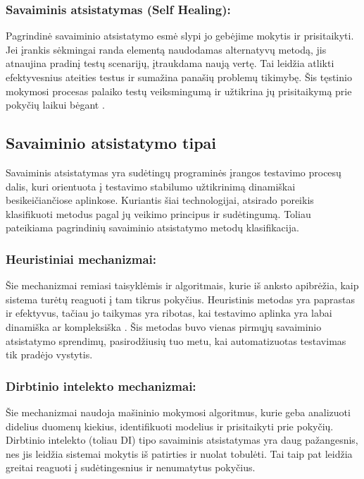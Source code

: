 \documentclass[
]{VUMIFPSkursinis}
\begin{document}
\subsubsection{Savaiminis atsistatymas (Self Healing):} Pagrindinė savaiminio atsistatymo esmė slypi jo gebėjime mokytis ir prisitaikyti. Jei įrankis sėkmingai randa elementą naudodamas alternatyvų metodą, jis atnaujina pradinį testų scenarijų, įtraukdama naują vertę. Tai leidžia atlikti efektyvesnius ateities testus ir sumažina panašių problemų tikimybę. Šis tęstinio mokymosi procesas palaiko testų veiksmingumą ir užtikrina jų prisitaikymą prie pokyčių laikui bėgant \cite{garlan2004}.

\subsection{Savaiminio atsistatymo tipai}

Savaiminis atsistatymas yra sudėtingų programinės įrangos testavimo procesų dalis, kuri orientuota į testavimo stabilumo užtikrinimą dinamiškai besikeičiančiose aplinkose. Kuriantis šiai technologijai, atsirado poreikis klasifikuoti metodus pagal jų veikimo principus ir sudėtingumą. Toliau pateikiama pagrindinių savaiminio atsistatymo metodų klasifikacija.

\subsubsection{Heuristiniai mechanizmai:} Šie mechanizmai remiasi taisyklėmis ir algoritmais, kurie iš anksto apibrėžia, kaip sistema turėtų reaguoti į tam tikrus pokyčius. Heuristinis metodas yra paprastas ir efektyvus, tačiau jo taikymas yra ribotas, kai testavimo aplinka yra labai dinamiška ar kompleksiška \cite{lewis2010}. Šis metodas buvo vienas pirmųjų savaiminio atsistatymo sprendimų, pasirodžiusių tuo metu, kai automatizuotas testavimas tik pradėjo vystytis.
    
\subsubsection{Dirbtinio intelekto mechanizmai:} Šie mechanizmai naudoja mašininio mokymosi algoritmus, kurie geba analizuoti didelius duomenų kiekius, identifikuoti modelius ir prisitaikyti prie pokyčių. Dirbtinio intelekto (toliau DI) tipo savaiminis atsistatymas yra daug pažangesnis, nes jis leidžia sistemai mokytis iš patirties ir nuolat tobulėti. Tai taip pat leidžia greitai reaguoti į sudėtingesnius ir nenumatytus pokyčius.
\end{document}
